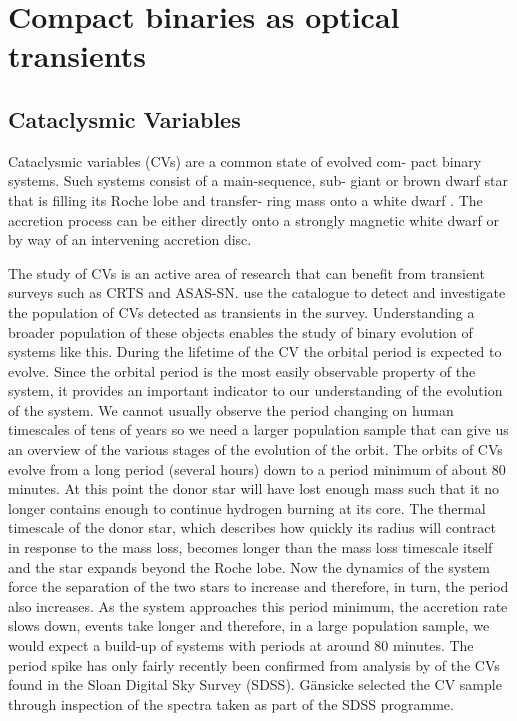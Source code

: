\documentclass[a4paper,fleqn,usenatbib]{mnras}
\begin{document}
\section{Compact binaries as optical transients}

\subsection{Cataclysmic Variables}
Cataclysmic variables (CVs) are a common state of evolved com- pact binary systems. Such systems consist of a main-sequence, sub- giant or brown dwarf star that is filling its Roche lobe and transfer- ring mass onto a white dwarf \citep{WarnerBook}. The accretion process can be either directly onto a strongly magnetic white dwarf or by way of an intervening accretion disc. 

The study of CVs is an active area of research that can benefit from transient surveys such as CRTS and ASAS-SN. \citet{Breedt2014} use the catalogue to detect and investigate the population of CVs detected as transients in the survey. Understanding a broader population of these objects enables the study of binary evolution of systems like this.  During the lifetime of the CV the orbital period is expected to evolve. Since the orbital period is the most easily observable property of the system, it provides an important indicator to our understanding of the evolution of the system. We cannot usually observe the period changing on human timescales of tens of years so we need a larger population sample that can give us an overview of the various stages of the evolution of the orbit. The orbits of CVs evolve from a long period (several hours) down to a period minimum of about 80 minutes. At this point the donor star will have lost enough mass such that it no longer contains enough to continue hydrogen burning at its core. The thermal timescale of the donor star, which describes how quickly its radius will contract in response to the mass loss, becomes longer than the mass loss timescale itself and the star expands beyond the Roche lobe. Now the dynamics of the system force the separation of the two stars to increase and therefore, in turn, the period also increases. As the system approaches this period minimum, the accretion rate slows down, events take longer and therefore, in a large population sample, we would expect a build-up of systems with periods at around 80 minutes. The period spike has only fairly recently been confirmed from analysis by \citet{Gaensicke2009} of the CVs found in the Sloan Digital Sky Survey (SDSS).  G{\"a}nsicke selected the CV sample through inspection of the spectra taken as part of the SDSS programme. 
\end{document}
